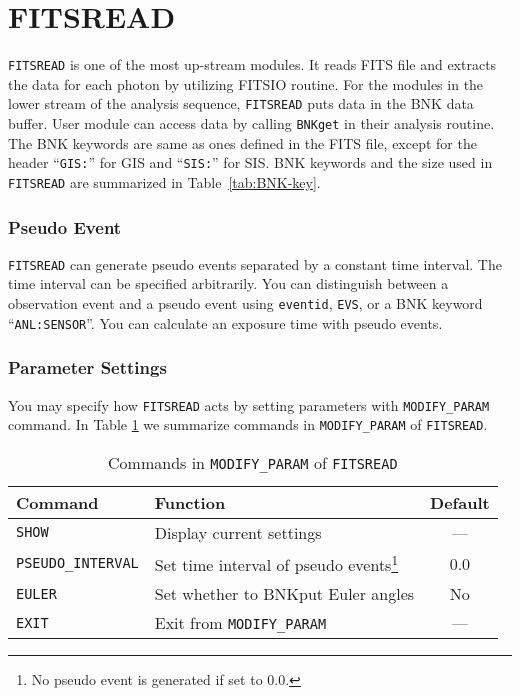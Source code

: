 \section{FITSREAD}\label{app:BNK-key}\label{sec:FITSREAD}
{\tt FITSREAD} is one of the most up-stream modules.
It  reads FITS file and extracts the data
for each photon  by utilizing FITSIO routine.
For the modules in the lower stream of the analysis sequence,
{\tt FITSREAD} puts data in the BNK data buffer.
User module can access data
by calling {\tt BNKget} in their analysis routine.
The BNK keywords are same as ones defined in the FITS file,
except for the header  ``{\tt GIS:}'' for GIS and ``{\tt SIS:}'' for SIS.
BNK keywords and the size used in {\tt FITSREAD}
are summarized in Table~\ref{tab:BNK-key}.

\subsubsection{Pseudo Event}
{\tt FITSREAD} can generate pseudo events separated by a constant time interval.
The time interval can be specified arbitrarily.
You can distinguish between a observation event and a pseudo event
using {\tt eventid}, {\tt EVS}, or a BNK keyword ``{\tt ANL:SENSOR}''.
You can calculate an exposure time with pseudo events.

\subsubsection{Parameter Settings}
You may specify how {\tt FITSREAD} acts
by setting parameters with {\tt MODIFY\_PARAM} command.
In Table \ref{tab:FITSREAD:MODIFY_PARAM}
we summarize commands in {\tt MODIFY\_PARAM} of {\tt FITSREAD}.

\begin{table}[htb]
\begin{minipage}{\textwidth}
\begin{center}
\begin{tabular}{|l|l|c|}
\hline
Command & Function & Default \\ \hline
{\tt SHOW}
	& Display current settings
	& --- \\
{\tt PSEUDO\_INTERVAL}
	& Set time interval of pseudo events\footnote{
		No pseudo event is generated if set to 0.0.}
	& 0.0 \\
{\tt EULER}
	& Set whether to BNKput Euler angles
	& No \\
{\tt EXIT}
	& Exit from {\tt MODIFY\_PARAM}
	& --- \\ \hline
\end{tabular}
\end{center}
\end{minipage}
\caption{Commands in {\tt MODIFY\_PARAM} of {\tt FITSREAD}}
\label{tab:FITSREAD:MODIFY_PARAM}
\end{table}

